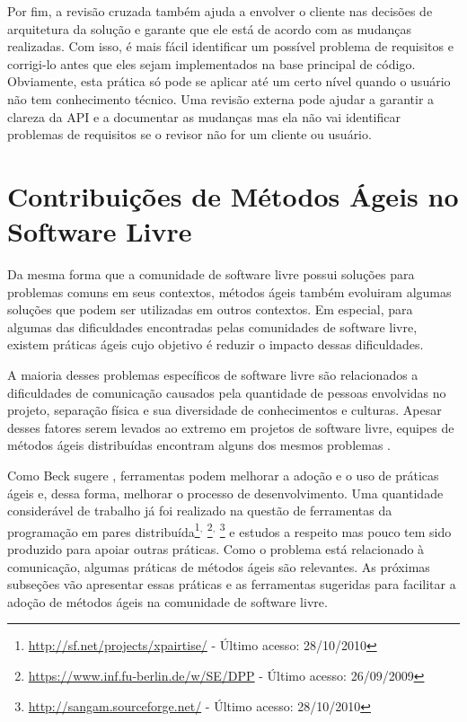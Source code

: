 Por fim, a revisão cruzada também ajuda a envolver o cliente nas
decisões de arquitetura da solução e garante que ele está de acordo
com as mudanças realizadas. Com isso, é mais fácil identificar um
possível problema de requisitos e corrigi-lo antes que eles sejam
implementados na base principal de código. Obviamente, esta prática só
pode se aplicar até um certo nível quando o usuário não tem
conhecimento técnico. Uma revisão externa pode ajudar a garantir a
clareza da API e a documentar as mudanças mas ela não vai identificar
problemas de requisitos se o revisor não for um cliente ou usuário.


\section{Contribuições de Métodos Ágeis no Software Livre}
\label{sec:agile-improve-os}

Da mesma forma que a comunidade de software livre possui soluções para
problemas comuns em seus contextos, métodos ágeis também evoluiram
algumas soluções que podem ser utilizadas em outros contextos. Em
especial, para algumas das dificuldades encontradas pelas comunidades
de software livre, existem práticas ágeis cujo objetivo é reduzir o
impacto dessas dificuldades.

A maioria desses problemas específicos de software livre são
relacionados a dificuldades de comunicação causados pela quantidade de
pessoas envolvidas no projeto, separação física e sua diversidade de
conhecimentos e culturas. Apesar desses fatores serem levados ao
extremo em projetos de software livre, equipes de métodos ágeis
distribuídas encontram alguns dos mesmos problemas
\cite{Sutherland2007,Maurer2002}.

Como Beck sugere \cite{Beck2008}, ferramentas podem melhorar a adoção
e o uso de práticas ágeis e, dessa forma, melhorar o processo de
desenvolvimento. Uma quantidade considerável de trabalho já foi
realizado na questão de ferramentas da programação em pares
distribuída\footnote{\url{http://sf.net/projects/xpairtise/} - Último
  acesso: 28/10/2010}$^{,}$
\footnote{\url{https://www.inf.fu-berlin.de/w/SE/DPP} - Último acesso:
  26/09/2009}$^{,}$ \footnote{\url{http://sangam.sourceforge.net/} -
  Último acesso: 28/10/2010} e estudos a respeito \cite{Nagappan2003}
mas pouco tem sido produzido para apoiar outras práticas. Como o
problema está relacionado à comunicação, algumas práticas de métodos
ágeis são relevantes. As próximas subseções vão apresentar essas
práticas e as ferramentas sugeridas para facilitar a adoção de métodos
ágeis na comunidade de software livre.

